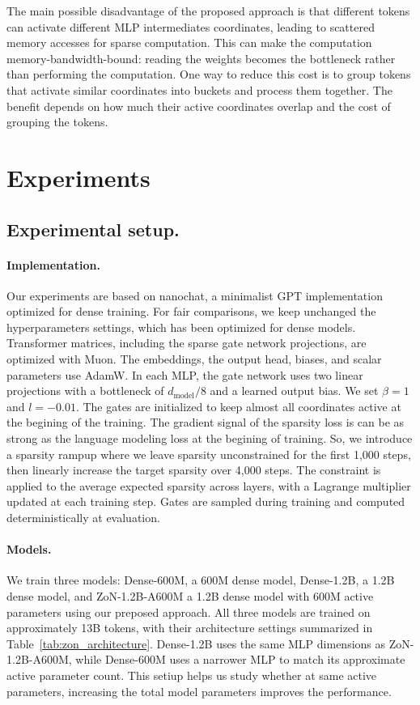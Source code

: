 \documentclass{article} %
\begin{document}
The main possible disadvantage of the proposed approach is 
that different tokens can activate different MLP intermediates coordinates,
leading to scattered memory accesses for sparse computation.
This can make the computation memory-bandwidth-bound: reading the weights becomes
the bottleneck rather than performing the computation. One way to reduce this cost
is to group tokens that activate similar coordinates into buckets and process them
together. The benefit depends on how much their active coordinates overlap 
and the cost of grouping the tokens.

\section{Experiments}
\label{sec:zon_results}

\subsection{Experimental setup.}
\paragraph{Implementation.}
Our experiments are based on nanochat, a minimalist GPT implementation optimized
for dense training. For fair comparisons, we keep unchanged the hyperparameters
settings, which has been optimized for dense models. Transformer matrices,
including the sparse gate network projections, are optimized with Muon. 
The embeddings, the output head, biases, and scalar parameters use AdamW. 
In each MLP, the gate network uses two linear projections with a bottleneck 
of $d_{\text{model}}/8$ and a learned output bias. We set $\beta=1$ and $l=-0.01$. 
The gates are initialized to keep almost all coordinates active at the begining of the training.
The gradient signal of the sparsity loss is can be as strong as the language modeling
loss at the begining of training.
So, we introduce a sparsity rampup where we leave sparsity unconstrained 
for the first 1,000 steps, then linearly increase the target sparsity over 4,000 steps. 
The constraint is applied to the average expected sparsity across layers, 
with a Lagrange multiplier updated at each training step. 
Gates are sampled during training and computed deterministically at evaluation.


\paragraph{Models.}
We train three models: Dense-600M, a 600M dense model, Dense-1.2B, a 1.2B dense model, and 
ZoN-1.2B-A600M a 1.2B dense model with 600M active parameters using our preposed approach. 
All three models are trained on approximately 13B tokens, with their architecture
settings summarized in Table~\ref{tab:zon_architecture}. Dense-1.2B uses the same
MLP dimensions as ZoN-1.2B-A600M, while Dense-600M uses a narrower MLP to match its
approximate active parameter count. This setiup helps us study whether at same
active parameters, increasing the total model parameters improves the performance.
\end{document}
